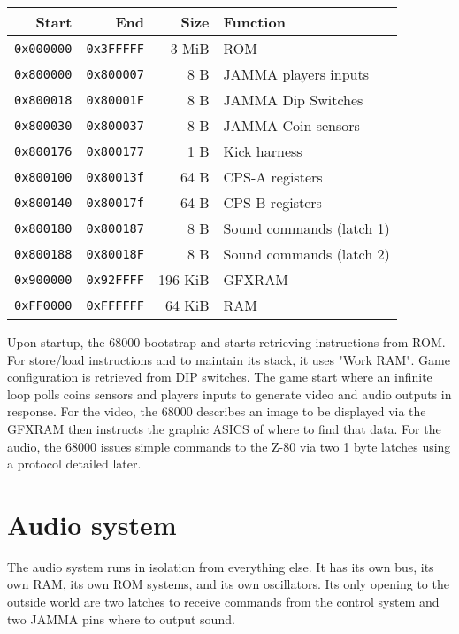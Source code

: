 \begin{tabularx}{\textwidth}{rrrX}
  \textbf{Start } & \textbf{End  } & \textbf{Size } & \textbf{Function } \\               
  \toprule    
  \texttt{0x000000} & \texttt{0x3FFFFF} & 3 MiB & ROM \\
  \toprule    
  \texttt{0x800000} & \texttt{0x800007} & 8 B & JAMMA players inputs \\
  \texttt{0x800018} & \texttt{0x80001F} & 8 B & JAMMA Dip Switches \\
  \texttt{0x800030} & \texttt{0x800037} & 8 B & JAMMA Coin sensors \\
  \texttt{0x800176} & \texttt{0x800177} & 1 B & Kick harness \\
\toprule    
  \texttt{0x800100} & \texttt{0x80013f} & 64 B & CPS-A registers\\
  \texttt{0x800140} & \texttt{0x80017f} & 64 B & CPS-B registers\\
\toprule    
  \texttt{0x800180} & \texttt{0x800187} & 8 B & Sound commands (latch 1)\\
  \texttt{0x800188} & \texttt{0x80018F} & 8 B & Sound commands (latch 2)\\
  \toprule    
  \texttt{0x900000} & \texttt{0x92FFFF} & 196 KiB & GFXRAM\\
  \texttt{0xFF0000} & \texttt{0xFFFFFF} & 64 KiB & RAM \\
\end{tabularx}%

Upon startup, the 68000 bootstrap and starts retrieving instructions from ROM. For store/load instructions and to maintain its stack, it uses "Work RAM". Game configuration is retrieved from DIP switches. The game start where an infinite loop polls coins sensors and players inputs to generate video and audio outputs in response. For the video, the 68000 describes an image to be displayed via the GFXRAM then instructs the graphic ASICS of where to find that data. For the audio, the 68000 issues simple commands to the Z-80 via two 1 byte latches using a protocol detailed later.
  











\pagebreak
\section{Audio system}
The audio system runs in isolation from everything else. It has its own bus, its own RAM, its own ROM systems, and its own oscillators. Its only opening to the outside world are two latches to receive commands from the control system and two JAMMA pins where to output sound.


